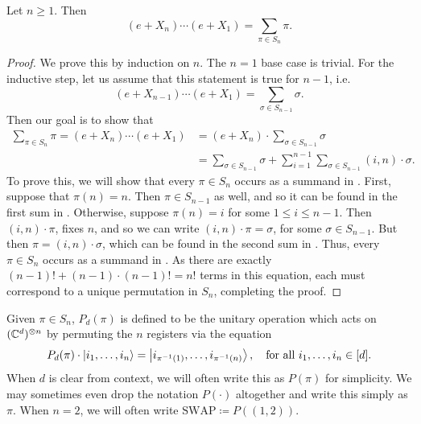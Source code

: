 \documentclass{article}
\newcommand{\swap}{\mathrm{SWAP}}
\begin{document}
\begin{proposition}\label{prop:jm-prod}
    Let $n \geq 1$. Then
    \begin{equation*}
        (e + X_n) \cdots (e + X_1) = \sum_{\pi \in S_n} \pi.
    \end{equation*}
\end{proposition}
\begin{proof}
    We prove this by induction on $n$.
    The $n = 1$ base case is trivial.
    For the inductive step, let us assume that this statement is true for $n-1$, i.e.\
    \begin{equation*}
        (e + X_{n-1}) \cdots (e + X_1) = \sum_{\sigma \in S_{n-1}} \sigma.
    \end{equation*}
    Then our goal is to show that
    \begin{align}
        \sum_{\pi \in S_n} \pi
        = (e + X_n) \cdots (e + X_1)
        &= (e + X_n) \cdot \sum_{\sigma \in S_{n-1}} \sigma\nonumber\\
        &= \sum_{\sigma \in S_{n-1}} \sigma
        + \sum_{i=1}^{n-1} \sum_{\sigma \in S_{n-1}} (i, n) \cdot \sigma.\label{eq:big-goal}
    \end{align}
    To prove this, we will show that every $\pi \in S_n$ occurs as a summand in .
    First, suppose that $\pi(n) = n$. Then $\pi \in S_{n-1}$ as well, and so it can be found in the first sum in .
    Otherwise, suppose $\pi(n) = i$ for some $1 \leq i \leq n-1$. Then $(i, n) \cdot \pi$, fixes $n$, and so we can write $(i, n) \cdot \pi = \sigma$, for some $\sigma \in S_{n-1}$. But then $\pi = (i, n) \cdot \sigma$, which can be found in the second sum in .
    Thus, every $\pi \in S_n$ occurs as a summand in \Cref{eq:big-goal}.
    As there are exactly $(n-1)! + (n-1) \cdot (n-1)! = n!$ terms in this equation, each must correspond to a unique permutation in $S_n$, completing the proof.
\end{proof}

Given $\pi \in S_n$, $P_d(\pi)$ is defined to be the unitary operation which acts on $(\mathbb C^d)^{\otimes n}$ by permuting the $n$ registers via the equation
\begin{equation*}
    P_d(\pi) \cdot \ket{i_1, \ldots, i_n}
    = \ket{i_{\pi^{-1}(1)}, \ldots, i_{\pi^{-1}(n)}},
    \quad \text{for all $i_1, \ldots, i_n \in [d]$}.
\end{equation*}
When $d$ is clear from context, we will often write this as $P(\pi)$ for simplicity.
We may sometimes even drop the notation $P(\cdot)$ altogether and write this simply as $\pi$.
When $n = 2$, we will often write $\swap \coloneqq P((1, 2))$.
\end{document}
